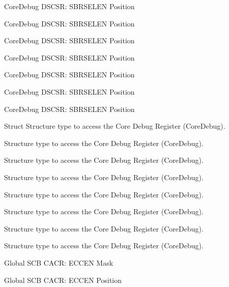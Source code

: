 \begin{DoxyRefList}
\label{deprecated__deprecated000227}%
%
Core\+Debug DSCSR\+: SBRSELEN Position 

\label{deprecated__deprecated000369}%
%
Core\+Debug DSCSR\+: SBRSELEN Position 

\label{deprecated__deprecated000097}%
%
Core\+Debug DSCSR\+: SBRSELEN Position 

\label{deprecated__deprecated000445}%
%
Core\+Debug DSCSR\+: SBRSELEN Position 

\label{deprecated__deprecated000650}%
%
Core\+Debug DSCSR\+: SBRSELEN Position 

\label{deprecated__deprecated000151}%
%
Core\+Debug DSCSR\+: SBRSELEN Position 

\label{deprecated__deprecated000548}%
%
Core\+Debug DSCSR\+: SBRSELEN Position  
\item[Struct \doxylink{struct_core_debug___type}{Core\+Debug\+\_\+\+Type} ]\label{deprecated__deprecated000158}%
%
Structure type to access the Core Debug Register (Core\+Debug). 

\label{deprecated__deprecated000004}%
%
Structure type to access the Core Debug Register (Core\+Debug). 

\label{deprecated__deprecated000455}%
%
Structure type to access the Core Debug Register (Core\+Debug). 

\label{deprecated__deprecated000300}%
%
Structure type to access the Core Debug Register (Core\+Debug). 

\label{deprecated__deprecated000104}%
%
Structure type to access the Core Debug Register (Core\+Debug). 

\label{deprecated__deprecated000557}%
%
Structure type to access the Core Debug Register (Core\+Debug). 

\label{deprecated__deprecated000376}%
%
Structure type to access the Core Debug Register (Core\+Debug). 

\label{deprecated__deprecated000243}%
%
Structure type to access the Core Debug Register (Core\+Debug).  
\item[Global \doxylink{group___c_m_s_i_s___s_c_b_ga7456a0b93710e8b9fa2b94c946e96c5c}{SCB\+\_\+\+CACR\+\_\+\+ECCEN\+\_\+\+Msk} ]\label{deprecated__deprecated000556}%
%
SCB CACR\+: ECCEN Mask  
\item[Global \doxylink{group___c_m_s_i_s___s_c_b_ga76ce5adcbed2d2d8d425214a1e5d0579}{SCB\+\_\+\+CACR\+\_\+\+ECCEN\+\_\+\+Pos} ]\label{deprecated__deprecated000555}%
%
SCB CACR\+: ECCEN Position 
\end{DoxyRefList}